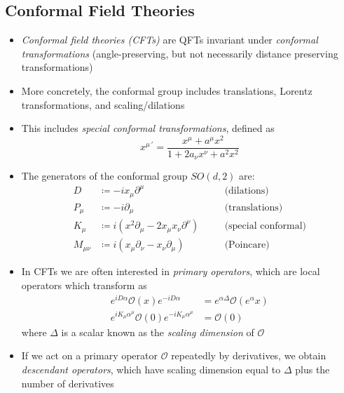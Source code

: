 \documentclass[12pt,a4paper]{article}
\numberwithin{equation}{section}
\begin{document}
	\subsection{Conformal Field Theories}
	\begin{itemize}
		\item \textit{Conformal field theories (CFTs)} are QFTs invariant under \textit{conformal transformations} (angle-preserving, but not necessarily distance preserving transformations)
		\item More concretely, the conformal group includes translations, Lorentz transformations, and scaling/dilations
		\item This includes \textit{special conformal transformations}, defined as
		\begin{equation}
			x^{\mu\,'}=\frac{x^{\mu}+a^{\mu}x^{2}}{1+2a_{\nu}x^{\nu}+a^{2}x^{2}}
		\end{equation}
		\item The generators of the conformal group $SO(d,2)$ are:
		\begin{equation}
			\begin{aligned}
				D&\coloneqq -ix_{\mu}\partial^{\mu} & \quad &\text{(dilations)}\\
				P_{\mu}&\coloneqq-i\partial_{\mu} & \quad &\text{(translations)}\\
				K_{\mu}&\coloneqq i(x^{2}\partial_{\mu}-2x_{\mu}x_{\nu}\partial^{\nu}) & \quad &\text{(special conformal)}\\
				M_{\mu\nu}&\coloneqq i(x_{\mu}\partial_{\nu}-x_{\nu}\partial_{\mu}) & \quad &\text{(Poincare)}
			\end{aligned}
		\end{equation}
		\item In CFTs we are often interested in \textit{primary operators}, which are local operators which transform as
		\begin{equation}
			\begin{aligned}
				e^{iD\alpha}\mathcal{O}(x)e^{-iD\alpha}&=e^{\alpha\Delta}\mathcal{O}(e^{\alpha}x)\\
				e^{iK_{\mu}\alpha^{\mu}}\mathcal{O}(0)e^{-iK_{\mu}\alpha^{\mu}}&=\mathcal{O}(0)
			\end{aligned}
		\end{equation}
		where $\Delta$ is a scalar known as the \textit{scaling dimension} of $\mathcal{O}$
		\item If we act on a primary operator $\mathcal{O}$ repeatedly by derivatives, we obtain \textit{descendant operators}, which have scaling dimension equal to $\Delta$ plus the number of derivatives

\end{itemize}
\end{document}
